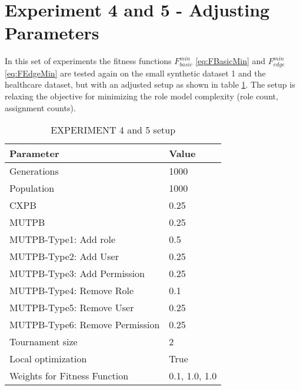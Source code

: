 \section{Experiment 4 and 5 - Adjusting Parameters}
\label{sec:phase3}
In this set of experiments the fitness functions $F_{basic}^{min}$ \eqref{eq:FBasicMin} and $F_{edge}^{min}$ \eqref{eq:FEdgeMin} are tested again on the small synthetic dataset 1 and the healthcare dataset, but with an adjusted setup as shown in table \ref{tab:setup3}. The setup is relaxing the objective for minimizing the role model complexity (role count, assignment counts).

\begin{table}[H]
    \centering
    \begin{tabular}{|l|l|}
        \hline
        \rowcolor{myGray} 
        \textbf{Parameter}              & \textbf{Value}    \\ \hline
        Generations                     & 1000              \\ \hline
        Population                      & 1000              \\ \hline
        CXPB                            & 0.25              \\ \hline
        MUTPB                           & 0.25              \\ \hline
        MUTPB-Type1: Add role           & 0.5               \\ \hline
        MUTPB-Type2: Add User           & 0.25              \\ \hline
        MUTPB-Type3: Add Permission     & 0.25              \\ \hline
        MUTPB-Type4: Remove Role        & 0.1               \\ \hline
        MUTPB-Type5: Remove User        & 0.25              \\ \hline
        MUTPB-Type6: Remove Permission  & 0.25              \\ \hline
        Tournament size                 & 2                 \\ \hline
        Local optimization              & True        		\\ \hline
        Weights for Fitness Function    & 0.1, 1.0, 1.0     \\ \hline
    \end{tabular}
    \caption{EXPERIMENT 4 and 5 setup}
    \label{tab:setup3}
\end{table}

